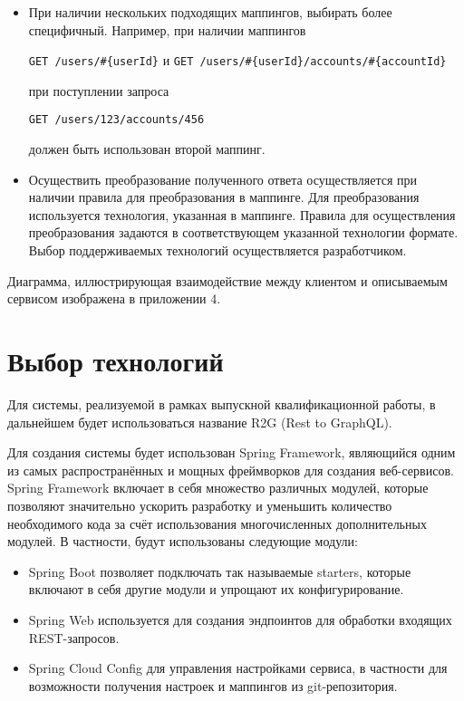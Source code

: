 \begin{itemize}
    \item При наличии нескольких подходящих маппингов, выбирать более специфичный.
    Например, при наличии маппингов

    \texttt{GET /users/\#\{userId\}} и \texttt{GET /users/\#\{userId\}/accounts/\#\{accountId\}}

    при поступлении запроса

    \texttt{GET /users/123/accounts/456}

    должен быть использован второй маппинг.

    \item Осуществить преобразование полученного ответа осуществляется при наличии правила для преобразования в маппинге.
    Для преобразования используется технология, указанная в маппинге.
    Правила для осуществления преобразования задаются в соответствующем указанной технологии формате.
    Выбор поддерживаемых технологий осуществляется разработчиком.
\end{itemize}

Диаграмма, иллюстрирующая взаимодействие между клиентом и описываемым сервисом изображена в приложении 4.

\section{Выбор технологий}\label{sec:choose-technology}

Для системы, реализуемой в рамках выпускной квалификационной работы, в дальнейшем будет использоваться название R2G (Rest to GraphQL).

Для создания системы будет использован Spring Framework, являющийся одним из самых распространённых и мощных фреймворков для создания веб-сервисов.
Spring Framework включает в себя множество различных модулей, которые позволяют значительно ускорить разработку и уменьшить количество необходимого кода за счёт использования многочисленных дополнительных модулей.
В частности, будут использованы следующие модули:

\begin{itemize}
    \item Spring Boot позволяет подключать так называемые starters, которые включают в себя другие модули и упрощают их конфигурирование.
    \item Spring Web используется для создания эндпоинтов для обработки входящих REST-запросов.
    \item Spring Cloud Config для управления настройками сервиса, в частности для возможности получения настроек и маппингов из git-репозитория.
\end{itemize}

